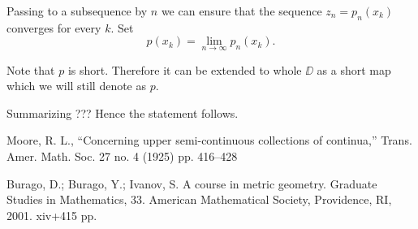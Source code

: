 \documentclass[a4paper,10pt]{amsart}
\begin{document}
Passing to a subsequence by $n$ we can ensure that the sequence
$z_n=p_n(x_k)$ converges for every $k$.
Set 
\[p(x_k)=\lim_{n\to\infty} p_n(x_k).\]

Note that $p$ is short. 
Therefore it can be extended to whole $\DD$ as a short map which we will still denote as $p$.

Summarizing ??? Hence the statement follows.\qeds


\begin{thebibliography}{52}
Moore, R. L.,
``Concerning upper semi-continuous collections of continua,''
Trans. Amer. Math. Soc. 27 no. 4 (1925) pp. 416--428

Burago, D.; Burago, Y.; Ivanov, S.
A course in metric geometry.
Graduate Studies in Mathematics, 33. American Mathematical Society, Providence, RI, 2001. xiv+415 pp. 
\end{thebibliography}
\end{document}
